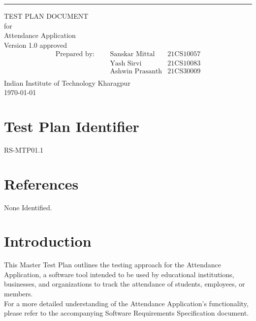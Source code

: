 \documentclass{scrreprt}
\date{}
\def\myversion{1.0 }
\begin{document}
\begin{flushright}
    \rule{16cm}{5pt}\vskip1cm
    \begin{bfseries}
        \Huge{TEST PLAN DOCUMENT}\\
        \vspace{1cm}
        for\\
        \vspace{1cm}
        Attendance Application\\
        \vspace{1cm}
        \LARGE{Version \myversion approved}\\
        \vspace{0cm}
        \begin{align*}
        \text{Prepared by: } \;\;\;\; 
         &\text{Sanskar Mittal} &\text{21CS10057}\\
         &\text{Yash Sirvi} &\text{21CS10083}\\
         &\text{Ashwin Prasanth} &\text{21CS30009}\\
        \end{align*}
        \vspace{1.9cm}
        Indian Institute of Technology Kharagpur\\
        \vspace{1.9cm}
        \today\\
    \end{bfseries}
\end{flushright}

\tableofcontents

\pagebreak

\chapter{Test Plan Identifier}
RS-MTP01.1

\chapter{References}
None Identified.

\chapter{Introduction}
This Master Test Plan outlines the testing approach for the Attendance Application, a software tool intended to be used by educational institutions, businesses, and organizations to track the attendance of students, employees, or
members.\\
For a more detailed understanding of the Attendance Application's functionality, please refer to the accompanying Software Requirements Specification document.
\end{document}
